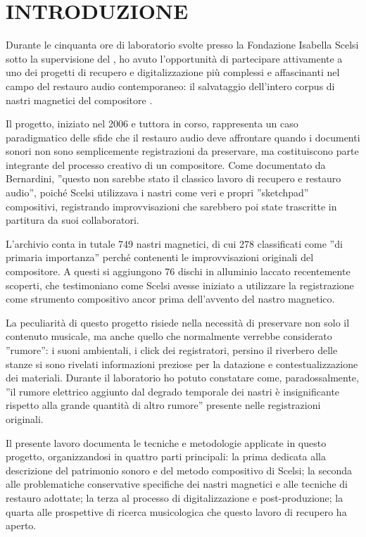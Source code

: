 
\section{INTRODUZIONE}
Durante le cinquanta ore di laboratorio svolte presso la Fondazione Isabella Scelsi sotto la supervisione del , ho avuto l'opportunità di partecipare attivamente a uno dei progetti di recupero e digitalizzazione più complessi e affascinanti nel campo del restauro audio contemporaneo: il salvataggio dell'intero corpus di nastri magnetici del compositore .

Il progetto, iniziato nel 2006 e tuttora in corso, rappresenta un caso paradigmatico delle sfide che il restauro audio deve affrontare quando i documenti sonori non sono semplicemente registrazioni da preservare, ma costituiscono parte integrante del processo creativo di un compositore. Come documentato da Bernardini, ''questo non sarebbe stato il classico lavoro di recupero e restauro audio''\cite{Bernardini2007recoveringgia}, poiché Scelsi utilizzava i nastri come veri e propri ''sketchpad'' compositivi, registrando improvvisazioni che sarebbero poi state trascritte in partitura da suoi collaboratori.

L'archivio conta in tutale 749 nastri magnetici, di cui 278 classificati come ''di primaria importanza'' perché contenenti le improvvisazioni originali del compositore\cite{Bernardini2012themul}. A questi si aggiungono 76 dischi in alluminio laccato recentemente scoperti, che testimoniano come Scelsi avesse iniziato a utilizzare la registrazione come strumento compositivo ancor prima dell'avvento del nastro magnetico\cite[p. 185]{Bernardini2012themul}.

La peculiarità di questo progetto risiede nella necessità di preservare non solo il contenuto musicale, ma anche quello che normalmente verrebbe considerato ''rumore'': i suoni ambientali, i click dei registratori, persino il riverbero delle stanze si sono rivelati informazioni preziose per la datazione e contestualizzazione dei materiali. Durante il laboratorio ho potuto constatare come, paradossalmente, ''il rumore elettrico aggiunto dal degrado temporale dei nastri è insignificante rispetto alla grande quantità di altro rumore'' presente nelle registrazioni originali\cite[p. 170]{Bernardini2012themul}.

Il presente lavoro documenta le tecniche e metodologie applicate in questo progetto, organizzandosi in quattro parti principali: la prima dedicata alla descrizione del patrimonio sonoro e del metodo compositivo di Scelsi; la seconda alle problematiche conservative specifiche dei nastri magnetici e alle tecniche di restauro adottate; la terza al processo di digitalizzazione e post-produzione; la quarta alle prospettive di ricerca musicologica che questo lavoro di recupero ha aperto.

